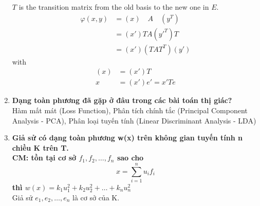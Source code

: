 \begin{enumerate}
    $T$ is the transition matrix from the old basis to the new one in $E$.
    \begin{align*} 
    \varphi(x, y) &= (x) \quad A \quad (y^T)\\
    &= (x') T A (y'^T) T \\
    &= (x') (T A T^T) (y')
    \end{align*}
    with
    \begin{align*}
       (x) &= (x')T\\
       x &= (x')e'=x'Te
    \end{align*}
    \item \textbf{Dạng toàn phương đã gặp ở đâu trong các bài toán thị giác?}\\
    Hàm mất mát (Loss Function), Phân tích chính tắc (Principal Component Analysis - PCA), Phân loại tuyến tính (Linear Discriminant Analysis - LDA)
    \item \textbf{Giả sử có dạng toàn phương w(x) trên không gian tuyến tính n  chiều K trên T.\\
    CM: tồn tại cơ sở $f_1, f_2, \ldots, f_n$ sao cho}
    \begin{equation*}
        x = \sum_{i=1}^n u_i f_i
    \end{equation*}
    \textbf{thì $w(x) = k_1 u_1^2 + k_2 u_2^2 + \ldots + k_n u_n^2$}\\
    Giả sử $e_1, e_2, \ldots, e_n$ là cơ sở của K.
    

\end{enumerate}
